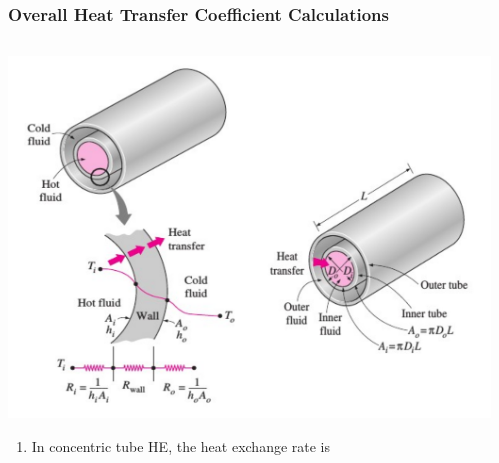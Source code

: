 \documentclass[10pt,compress,unknownkeysallowed]{beamer}
\begin{document}
\begin{frame}
  \frametitle{Overall Heat Transfer Coefficient Calculations}
    \begin{columns}
       \begin{column}[l]{0.5\linewidth}
         \includegraphics[width=1.1\columnwidth,clip]{./Pics/HeatExchangers_Flow}
         \begin{enumerate}\scriptsize
            \item<1-> In concentric tube HE, the heat exchange rate is
         \end{enumerate}
       \end{column}
       \begin{column}[l]{0.5\linewidth}
         \begin{enumerate}\setcounter{enumi}{1}\scriptsize

\end{enumerate}
\end{column}
\end{columns}
\end{frame}
\end{document}
